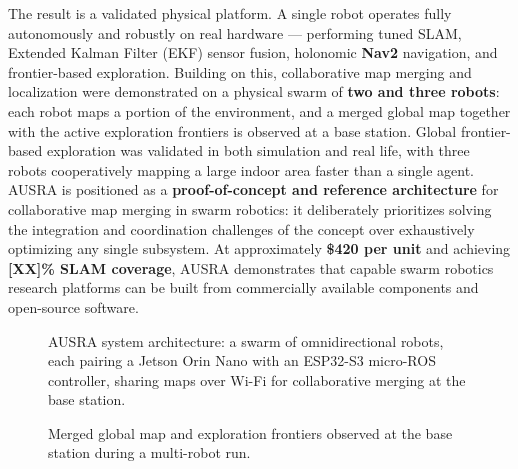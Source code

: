 The result is a validated physical platform. A single robot operates fully autonomously and robustly on real hardware --- performing tuned SLAM, Extended Kalman Filter (EKF) sensor fusion, holonomic \textbf{Nav2} navigation, and frontier-based exploration. Building on this, collaborative map merging and localization were demonstrated on a physical swarm of \textbf{two and three robots}: each robot maps a portion of the environment, and a merged global map together with the active exploration frontiers is observed at a base station. Global frontier-based exploration was validated in both simulation and real life, with three robots cooperatively mapping a large indoor area faster than a single agent. AUSRA is positioned as a \textbf{proof-of-concept and reference architecture} for collaborative map merging in swarm robotics: it deliberately prioritizes solving the integration and coordination challenges of the concept over exhaustively optimizing any single subsystem. At approximately \textbf{\$420 per unit} %
and achieving \textbf{[XX]\% SLAM coverage}, %
AUSRA demonstrates that capable swarm robotics research platforms can be built from commercially available components and open-source software.

\begin{figure}[H]
    \centering
    \caption{AUSRA system architecture: a swarm of omnidirectional robots, each pairing a Jetson Orin Nano with an ESP32-S3 micro-ROS controller, sharing maps over Wi-Fi for collaborative merging at the base station.}
    \label{fig:system_architecture}
\end{figure}

\begin{figure}[H]
    \centering
    \begin{minipage}[t]{0.48\textwidth}
        \centering
        \caption{The assembled AUSRA robot with key components labeled.}
        \label{fig:robot_annotated}
    \end{minipage}
    \hfill
    \begin{minipage}[t]{0.48\textwidth}
        \centering
        \caption{Merged global map and exploration frontiers observed at the base station during a multi-robot run.}
        \label{fig:merged_map_teaser}
    \end{minipage}
\end{figure}

